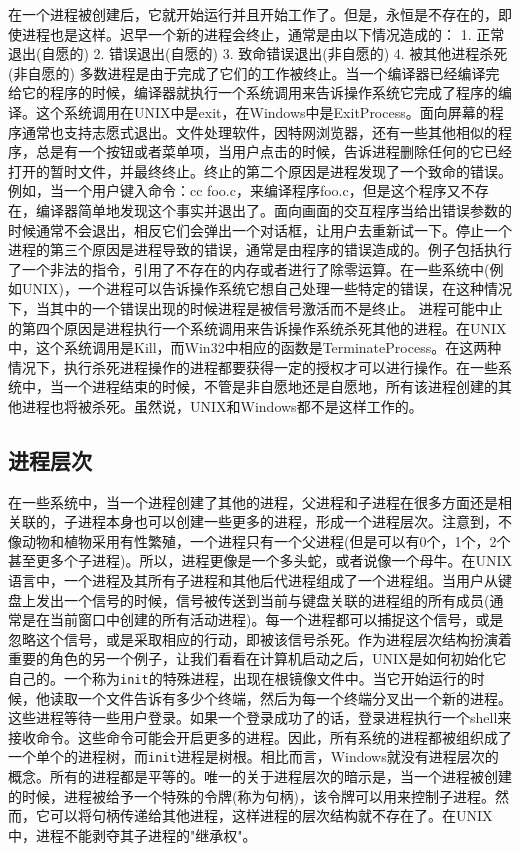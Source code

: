 	在一个进程被创建后，它就开始运行并且开始工作了。但是，永恒是不存在的，即使进程也是这样。迟早一个新的进程会终止，通常是由以下情况造成的：
	1. 正常退出(自愿的)
	2. 错误退出(自愿的)
	3. 致命错误退出(非自愿的)
	4. 被其他进程杀死(非自愿的)
	多数进程是由于完成了它们的工作被终止。当一个编译器已经编译完给它的程序的时候，编译器就执行一个系统调用来告诉操作系统它完成了程序的编译。这个系统调用在UNIX中是exit，在Windows中是ExitProcess。面向屏幕的程序通常也支持志愿式退出。文件处理软件，因特网浏览器，还有一些其他相似的程序，总是有一个按钮或者菜单项，当用户点击的时候，告诉进程删除任何的它已经打开的暂时文件，并最终终止。终止的第二个原因是进程发现了一个致命的错误。例如，当一个用户键入命令：cc foo.c，来编译程序foo.c，但是这个程序又不存在，编译器简单地发现这个事实并退出了。面向画面的交互程序当给出错误参数的时候通常不会退出，相反它们会弹出一个对话框，让用户去重新试一下。停止一个进程的第三个原因是进程导致的错误，通常是由程序的错误造成的。例子包括执行了一个非法的指令，引用了不存在的内存或者进行了除零运算。在一些系统中(例如UNIX)，一个进程可以告诉操作系统它想自己处理一些特定的错误，在这种情况下，当其中的一个错误出现的时候进程是被信号激活而不是终止。
	进程可能中止的第四个原因是进程执行一个系统调用来告诉操作系统杀死其他的进程。在UNIX中，这个系统调用是Kill，而Win32中相应的函数是TerminateProcess。在这两种情况下，执行杀死进程操作的进程都要获得一定的授权才可以进行操作。在一些系统中，当一个进程结束的时候，不管是非自愿地还是自愿地，所有该进程创建的其他进程也将被杀死。虽然说，UNIX和Windows都不是这样工作的。
	
	\subsection{进程层次}
	
	在一些系统中，当一个进程创建了其他的进程，父进程和子进程在很多方面还是相关联的，子进程本身也可以创建一些更多的进程，形成一个进程层次。注意到，不像动物和植物采用有性繁殖，一个进程只有一个父进程(但是可以有0个，1个，2个甚至更多个子进程)。所以，进程更像是一个多头蛇，或者说像一个母牛。在UNIX语言中，一个进程及其所有子进程和其他后代进程组成了一个进程组。当用户从键盘上发出一个信号的时候，信号被传送到当前与键盘关联的进程组的所有成员(通常是在当前窗口中创建的所有活动进程)。每一个进程都可以捕捉这个信号，或是忽略这个信号，或是采取相应的行动，即被该信号杀死。作为进程层次结构扮演着重要的角色的另一个例子，让我们看看在计算机启动之后，UNIX是如何初始化它自己的。一个称为\texttt{init}的特殊进程，出现在根镜像文件中。当它开始运行的时候，他读取一个文件告诉有多少个终端，然后为每一个终端分叉出一个新的进程。这些进程等待一些用户登录。如果一个登录成功了的话，登录进程执行一个shell来接收命令。这些命令可能会开启更多的进程。因此，所有系统的进程都被组织成了一个单个的进程树，而\texttt{init}进程是树根。相比而言，Windows就没有进程层次的概念。所有的进程都是平等的。唯一的关于进程层次的暗示是，当一个进程被创建的时候，进程被给予一个特殊的令牌(称为句柄)，该令牌可以用来控制子进程。然而，它可以将句柄传递给其他进程，这样进程的层次结构就不存在了。在UNIX中，进程不能剥夺其子进程的"继承权"。
	
